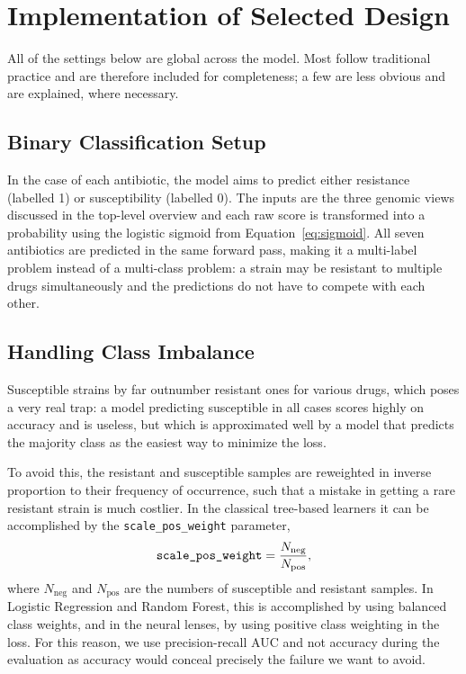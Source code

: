 \FloatBarrier
\section{Implementation of Selected Design}
\label{subsec:common_framework}

All of the settings below are global across the model. Most follow traditional practice and
are therefore included for completeness; a few are less obvious and are explained, where
necessary.

\subsection{Binary Classification Setup}

In the case of each antibiotic, the model aims to predict either resistance (labelled 1) or
susceptibility (labelled 0). The inputs are the three genomic views discussed in the top-level
overview and each raw score is transformed into a probability using the logistic sigmoid from
Equation~\eqref{eq:sigmoid}. All seven antibiotics are predicted in the same forward pass,
making it a multi-label problem instead of a multi-class problem: a strain may be resistant to
multiple drugs simultaneously and the predictions do not have to compete with each other.

\subsection{Handling Class Imbalance}

Susceptible strains by far outnumber resistant ones for various drugs, which poses a very real
trap: a model predicting susceptible in all cases scores highly on accuracy and is useless,
but which is approximated well by a model that predicts the majority class as the easiest way
to minimize the loss.

To avoid this, the resistant and susceptible samples are reweighted in inverse proportion to
their frequency of occurrence, such that a mistake in getting a rare resistant strain is much
costlier. In the classical tree-based learners it can be accomplished by the
\texttt{scale\_pos\_weight} parameter,
\begin{equation}
\text{\texttt{scale\_pos\_weight}} = \frac{N_{\text{neg}}}{N_{\text{pos}}},
\label{eq:scale_pos_weight}
\end{equation}
where $N_{\text{neg}}$ and $N_{\text{pos}}$ are the numbers of susceptible and resistant
samples. In Logistic Regression and Random Forest, this is accomplished by using balanced
class weights, and in the neural lenses, by using positive class weighting in the loss. For
this reason, we use precision-recall AUC and not accuracy during the evaluation as accuracy
would conceal precisely the failure we want to avoid.

